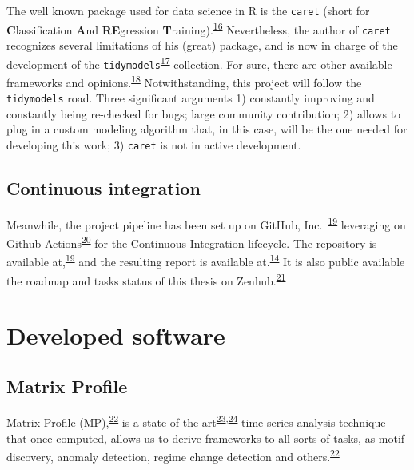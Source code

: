 \documentclass[12pt,twoside]{fmupthesis}
\begin{document}
The well known package used for data science in R is the \texttt{caret} (short for \textbf{C}lassification
\textbf{A}nd \textbf{RE}gression \textbf{T}raining).\textsuperscript{\protect\hyperlink{ref-JSSv028i05}{16}} Nevertheless, the author of \texttt{caret} recognizes
several limitations of his (great) package, and is now in charge of the development of the
\texttt{tidymodels}\textsuperscript{\protect\hyperlink{ref-tidymodels2020}{17}} collection. For sure, there are other available frameworks and
opinions.\textsuperscript{\protect\hyperlink{ref-Thompson2020}{18}} Notwithstanding, this project will follow the \texttt{tidymodels} road. Three
significant arguments 1) constantly improving and constantly being re-checked for bugs; large
community contribution; 2) allows to plug in a custom modeling algorithm that, in this case, will be
the one needed for developing this work; 3) \texttt{caret} is not in active development.

\hypertarget{continuous-integration}{%
\subsection{Continuous integration}\label{continuous-integration}}

Meanwhile, the project pipeline has been set up on GitHub, Inc.~\textsuperscript{\protect\hyperlink{ref-bischoffrepo2021}{19}} leveraging on
Github Actions\textsuperscript{\protect\hyperlink{ref-gitactions2021}{20}} for the Continuous Integration lifecycle. The repository is
available at,\textsuperscript{\protect\hyperlink{ref-bischoffrepo2021}{19}} and the resulting report is available at.\textsuperscript{\protect\hyperlink{ref-franz_website}{14}}
It is also public available the roadmap and tasks status of this thesis on Zenhub.\textsuperscript{\protect\hyperlink{ref-zenhub2021}{21}}

\hypertarget{developed-software}{%
\section{Developed software}\label{developed-software}}

\hypertarget{matrixprofile}{%
\subsection{Matrix Profile}\label{matrixprofile}}

Matrix Profile (MP),\textsuperscript{\protect\hyperlink{ref-Yeh2017a}{22}} is a state-of-the-art\textsuperscript{\protect\hyperlink{ref-DePaepe2020}{23},\protect\hyperlink{ref-Feremans2020}{24}} time series
analysis technique that once computed, allows us to derive frameworks to all sorts of tasks, as
motif discovery, anomaly detection, regime change detection and others.\textsuperscript{\protect\hyperlink{ref-Yeh2017a}{22}}
\end{document}
